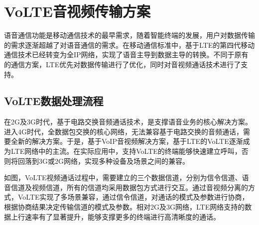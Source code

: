 \section{VoLTE音视频传输方案}
\label{chap:backinfo:volte}



语音通信功能是移动通信技术的最早需求，随着智能终端的发展，用户对数据传输的需求逐渐超越了对语音通信的需求。在移动通信标准中，基于LTE的第四代移动通信技术已经转变为全IP网络，实现了语音主导到数据主导的转换。不同于原有的通信方案，LTE优先对数据传输进行了优化，同时对音视频通话技术进行了支持。

\subsection{VoLTE数据处理流程}
\label{chap:backinfo:volte:datastream}

在2G及3G时代，基于电路交换音频通话技术，是支撑语音业务的核心解决方案。进入4G时代，全数据包交换的核心网络，无法兼容基于电路交换的音频通话，需要全新的解决方案。于是，基于VoIP音视频解决方案，基于LTE的VoLTE逐渐成为LTE网络中的主流。在实际应用中，支持VoLTE的终端能够快速建立呼叫，否则将回落到3G或2G网络，实现多种设备及场景之间的兼容。

如图，VoLTE视频通话过程中，需要建立的三个数据信道，分别为信令信道、语音信道及视频信道，所有的信道均采用数据包方式进行交互。通过音视频分离的方式，VoLTE实现了多场景兼容，通过信令信道，对通话的模式及参数进行协商，根据协商结果决定传输信道的模式及参数。相对2G及3G网络，LTE网络支持的数据上行速率有了显著提升，能够支撑更多的终端进行高清晰度的通话。

